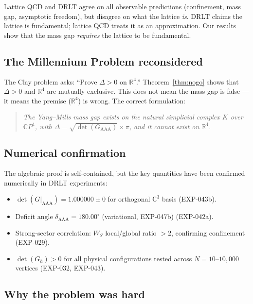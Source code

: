 \documentclass[12pt]{article}
\theoremstyle{remark}
\begin{document}
\noindent
Lattice QCD and DRLT agree on all observable predictions (confinement,
mass gap, asymptotic freedom), but disagree on what the lattice \emph{is}.
DRLT claims the lattice is fundamental; lattice QCD treats it as an
approximation. Our results show that the mass gap \emph{requires}
the lattice to be fundamental.

\subsection{The Millennium Problem reconsidered}

The Clay problem asks: ``Prove $\Delta > 0$ on $\mathbb{R}^4$.''
Theorem~\ref{thm:nogo} shows that $\Delta > 0$ and $\mathbb{R}^4$ are
mutually exclusive. This does not mean the mass gap is false --- it
means the premise ($\mathbb{R}^4$) is wrong. The correct formulation:

\begin{quote}
\emph{The Yang--Mills mass gap exists on the natural simplicial complex
$K$ over $\mathbb{C}P^4$, with $\Delta = \sqrt{\det(G_{\mathrm{AAA}})}
\times \pi$, and it cannot exist on $\mathbb{R}^4$.}
\end{quote}

\subsection{Numerical confirmation}

The algebraic proof is self-contained, but the key quantities have been
confirmed numerically in DRLT experiments:

\begin{itemize}
\item $\det(G|_{\mathrm{AAA}}) = 1.000000 \pm 0$ for orthogonal
  $\mathbb{C}^3$ basis (EXP-043b).
\item Deficit angle $\delta_{\mathrm{AAA}} = 180.00^\circ$ (variational, EXP-047b)
  (EXP-042a).
\item Strong-sector correlation: $W_S$ local/global ratio $> 2$,
  confirming confinement (EXP-029).
\item $\det(G_h) > 0$ for all physical configurations tested across
  $N = 10$--$10{,}000$ vertices (EXP-032, EXP-043).
\end{itemize}

\subsection{Why the problem was hard}
\end{document}
